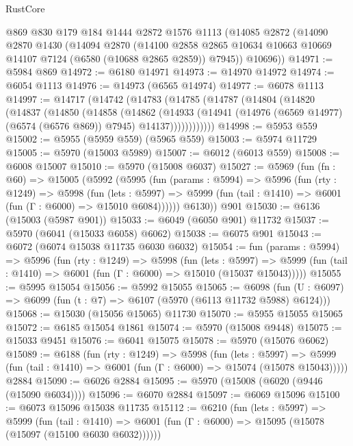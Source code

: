 \begin{lexlean}{RustCore}
\begin{coremodule}
    @869
    @830
    @179
    @184
    @1444
    @2872
    @1576
    @1113
    (@14085
      @2872
      (@14090
        @2870
        @1430
        (@14094
          @2870
          (@14100 @2858 @2865 @10634 @10663 @10669 @14107 @7124 (@6580 (@10688 @2865 @2859)) @7945))
        @10696))
@14971 := @5984 @869
@14972 := @6180 @14971
@14973 := @14970 @14972
@14974 := @6054 @1113
@14976 := @14973 (@6565 @14974)
@14977 := @6078 @1113
@14997 := @14717
    (@14742
      (@14783
        (@14785
          (@14787
            (@14804
              (@14820
                (@14837
                  (@14850
                    (@14858
                      (@14862
                        (@14933
                          (@14941
                            (@14976 (@6569 @14977) (@6574 (@6576 @869)) @7945)
                            @14137))))))))))))
@14998 := @5953 @559
@15002 := @5955 (@5959 @559) (@5965 @559)
@15003 := @5974 @11729
@15005 := @5970 (@15003 @5989)
@15007 := @6012 (@6013 @559)
@15008 := @6008 @15007
@15010 := @5970 (@15008 @6037)
@15027 := @5969
    (fun (fn : @60) =>
    @15005
      (@5992
        (@5995
          (fun (params : @5994) =>
          @5996
            (fun (rty : @1249) =>
            @5998
              (fun (lets : @5997) =>
              @5999 (fun (tail : @1410) => @6001 (fun (Γ : @6000) => @15010 @6084))))))
        @6130))
    @901
@15030 := @6136 (@15003 (@5987 @901))
@15033 := @6049 (@6050 @901) @11732
@15037 := @5970 (@6041 (@15033 @6058) @6062)
@15038 := @6075 @901
@15043 := @6072 (@6074 @15038 @11735 @6030 @6032)
@15054 := fun (params : @5994) =>
  @5996
    (fun (rty : @1249) =>
    @5998
      (fun (lets : @5997) =>
      @5999 (fun (tail : @1410) => @6001 (fun (Γ : @6000) => @15010 (@15037 @15043)))))
@15055 := @5995 @15054
@15056 := @5992 @15055
@15065 := @6098
    (fun (U : @6097) => @6099 (fun (t : @7) => @6107 (@5970 (@6113 @11732 @5988) @6124)))
@15068 := @15030 (@15056 @15065) @11730
@15070 := @5955 @15055 @15065
@15072 := @6185 @15054 @1861
@15074 := @5970 (@15008 @9448)
@15075 := @15033 @9451
@15076 := @6041 @15075
@15078 := @5970 (@15076 @6062)
@15089 := @6188
    (fun (rty : @1249) =>
    @5998
      (fun (lets : @5997) =>
      @5999 (fun (tail : @1410) => @6001 (fun (Γ : @6000) => @15074 (@15078 @15043)))))
    @2884
@15090 := @6026 @2884
@15095 := @5970 (@15008 (@6020 (@9446 (@15090 @6034))))
@15096 := @6070 @2884
@15097 := @6069 @15096
@15100 := @6073 @15096 @15038 @11735
@15112 := @6210
    (fun (lets : @5997) =>
    @5999
      (fun (tail : @1410) =>
      @6001 (fun (Γ : @6000) => @15095 (@15078 (@15097 (@15100 @6030 @6032))))))

\end{coremodule}
\end{lexlean}
